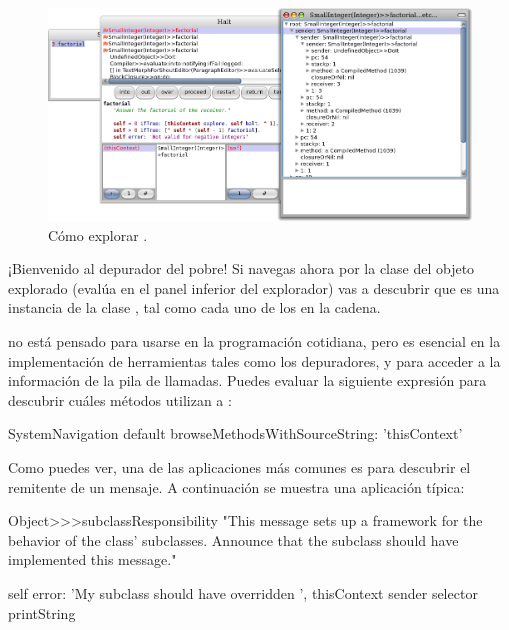 \documentclass[a4paper,10pt,twoside]{book}
\begin{document}

\begin{figure}[ht]\centering
        \includegraphics[width=\linewidth]{exploringThisContext}
        \caption{ C\'omo explorar
          .}
\end{figure}

¡Bienvenido al depurador del pobre!
Si navegas ahora por la clase del objeto explorado (eval\'ua 
en el panel inferior del explorador) vas a descubrir que es
una instancia de la clase , tal como cada uno de
los  en la cadena.


 no est\'a pensado para usarse en la programaci\'on
cotidiana, pero es esencial en la implementaci\'on de herramientas tales
como los depuradores, y para acceder a la informaci\'on de la pila de
llamadas.  Puedes evaluar la siguiente expresi\'on para descubrir cu\'ales
m\'etodos utilizan a :

\begin{code}{}
SystemNavigation default browseMethodsWithSourceString: 'thisContext'
\end{code}

Como puedes ver, una de las aplicaciones m\'as comunes es para descubrir
el remitente de un mensaje.  A continuaci\'on se muestra una aplicaci\'on
t\'ipica:
\begin{code}{}
Object>>>subclassResponsibility
        "This message sets up a framework for the behavior of the class' subclasses.
        Announce that the subclass should have implemented this message."

        self error: 'My subclass should have overridden ', thisContext sender selector printString
\end{code}
\end{document}
